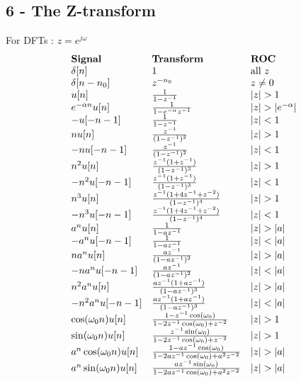 \documentclass{article}
\begin{document}
\subsection{6 - The Z-transform}
\begin{multicols}{2}
For DFTs : $z= e^{j\omega}$
$$
\begin{array}{lll}
\textbf{Signal} & \textbf{Transform} & \textbf{ROC}\\
 \delta[n]  &1 & \mbox{all }z \\
 \delta[n-n_0] & z^{-n_0}  & z \neq 0\\
 u[n] & \frac{1}{1-z^{-1} }&|z| > 1\\
 e^{-\alpha n} u[n]  &  1 \over 1-e^{-\alpha  }z^{-1}&  |z| >  |e^{-\alpha}| \\
 - u[-n-1] & \frac{1}{1 - z^{-1}}&|z| < 1\\
 n u[n] & \frac{z^{-1}}{( 1-z^{-1} )^2}&|z| > 1\\
 - n u[-n-1] & \frac{z^{-1} }{ (1 - z^{-1})^2 }& |z| < 1 \\
 n^2 u[n] &  \frac{ z^{-1} (1 + z^{-1} )}{(1 - z^{-1})^3} &|z| > 1\\
 - n^2 u[-n - 1] &  \frac{ z^{-1} (1 + z^{-1} )}{(1 - z^{-1})^3} &|z| < 1\\
 n^3 u[n] & \frac{z^{-1} (1 + 4 z^{-1} + z^{-2} )}{(1-z^{-1})^4} &|z| > 1\\
 - n^3 u[-n -1] & \frac{z^{-1} (1 + 4 z^{-1} + z^{-2} )}{(1-z^{-1})^4} &|z| < 1\\
 a^n u[n] & \frac{1}{1-a z^{-1}}& |z| > |a|\\
  -a^n u[-n-1] & \frac{1}{1-a z^{-1}}&|z| < |a|\\
  n a^n u[n] & \frac{az^{-1} }{ (1-a z^{-1})^2 }&|z| > |a|\\
  -n a^n u[-n-1] & \frac{az^{-1} }{ (1-a z^{-1})^2 }& |z| < |a|\\
  n^2 a^n u[n] & \frac{a z^{-1} (1 + a z^{-1}) }{(1-a z^{-1})^3} &|z| > |a|\\
  - n^2 a^n u[-n -1] & \frac{a z^{-1} (1 + a z^{-1}) }{(1-a z^{-1})^3} &|z| < |a|\\
  \cos(\omega_0 n) u[n] & \frac{ 1-z^{-1} \cos(\omega_0) }{ 1-2z^{-1}\cos(\omega_0)+ z^{-2} }& |z| >1\\
  \sin(\omega_0 n) u[n] & \frac{ z^{-1} \sin(\omega_0) }{ 1-2z^{-1}\cos(\omega_0)+ z^{-2} }& |z| >1\\
   a^n \cos(\omega_0 n) u[n] & \frac{ 1-a z^{-1} \cos( \omega_0) }{ 1-2az^{-1}\cos(\omega_0)+ a^2 z^{-2} }& |z| > |a|\\
a^n \sin(\omega_0 n) u[n] & \frac{ az^{-1} \sin(\omega_0) }{ 1-2az^{-1}\cos(\omega_0)+ a^2 z^{-2} }& |z| > |a|
\end{array}
$$

\end{multicols}
\end{document}

